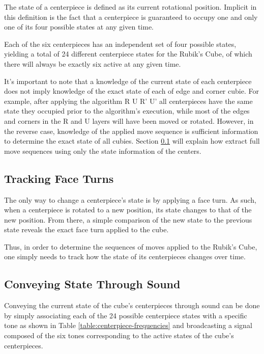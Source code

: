 The state of a centerpiece is defined as its current rotational position. 
Implicit in this definition is the fact that a centerpiece is guaranteed to occupy one and only one of its four possible states at any given time.

Each of the six centerpieces has an independent set of four possible states, yielding a total of 24 different centerpiece states for the Rubik's Cube, of which there will always be exactly six active at any given time.

It's important to note that a knowledge of the current state of each centerpiece does not imply knowledge of the exact state of each of edge and corner cubie.
For example, after applying the algorithm R U R' U' all centerpieces have the same state they occupied prior to the algorithm's execution, while most of the edges and corners in the R and U layers will have been moved or rotated.
However, in the reverse case, knowledge of the applied move sequence is sufficient information to determine the exact state of all cubies.
Section \ref{subsec:tracking-face-turns} will explain how extract full move sequences using only the state information of the centers.

\subsection{Tracking Face Turns}
\label{subsec:tracking-face-turns}
The only way to change a centerpiece's state is by applying a face turn.
As such, when a centerpiece is rotated to a new position, its state changes to that of the new position.
From there, a simple comparison of the new state to the previous state reveals the exact face turn applied to the cube.

Thus, in order to determine the sequences of moves applied to the Rubik's Cube, one simply needs to track how the state of its centerpieces changes over time. 

\subsection{Conveying State Through Sound}
\label{subsec:conveying-state-through-sound}
Conveying the current state of the cube's centerpieces through sound can be done by simply associating each of the 24 possible centerpiece states with a specific tone as shown in Table \ref{table:centerpiece-frequencies} and broadcasting a signal composed of the six tones corresponding to the active states of the cube's centerpieces.

